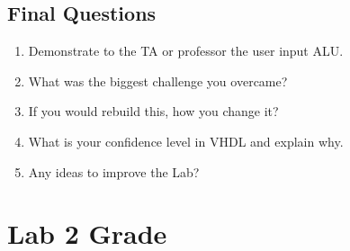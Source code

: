 \documentclass{article}
\begin{document}
\subsection{Final Questions}
\begin{enumerate}
  \item Demonstrate to the TA or professor the user input ALU.
  \item What was the biggest challenge you overcame?
  \item If you would rebuild this, how you change it?
  \item What is your confidence level in VHDL and explain why.
  \item Any ideas to improve the Lab?
\end{enumerate}

\newpage

\section{Lab 2 Grade}
\end{document}
